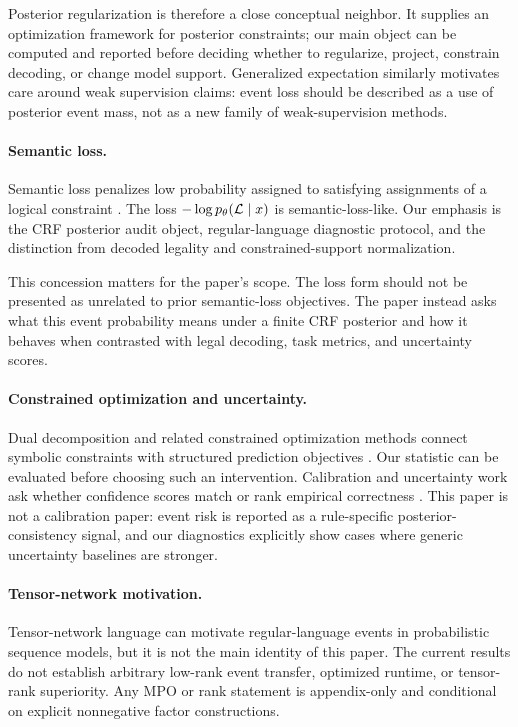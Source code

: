 Posterior regularization is therefore a close conceptual neighbor.  It supplies
an optimization framework for posterior constraints; our main object can be
computed and reported before deciding whether to regularize, project, constrain
decoding, or change model support.  Generalized expectation similarly motivates
care around weak supervision claims: event loss should be described as a use of
posterior event mass, not as a new family of weak-supervision methods.

\paragraph{Semantic loss.}
Semantic loss penalizes low probability assigned to satisfying assignments of a
logical constraint \citep{xu2018semantic}.  The loss
\(-\log p_{\theta}(\mathcal{L} \mid x)\) is semantic-loss-like.  Our emphasis is the CRF
posterior audit object, regular-language diagnostic protocol, and the
distinction from decoded legality and constrained-support normalization.

This concession matters for the paper's scope.  The loss form should not be
presented as unrelated to prior semantic-loss objectives.  The paper instead
asks what this event probability means under a finite CRF posterior and how it
behaves when contrasted with legal decoding, task metrics, and uncertainty
scores.

\paragraph{Constrained optimization and uncertainty.}
Dual decomposition and related constrained optimization methods connect
symbolic constraints with structured prediction objectives
\citep{rush2010dual}.  Our statistic can be evaluated before choosing such an
intervention.  Calibration and uncertainty work ask whether confidence scores
match or rank empirical correctness \citep{platt1999probabilities,guo2017calibration}.
This paper is not a calibration paper: event risk is reported as a
rule-specific posterior-consistency signal, and our diagnostics explicitly show
cases where generic uncertainty baselines are stronger.

\paragraph{Tensor-network motivation.}
Tensor-network language can motivate regular-language events in probabilistic
sequence models, but it is not the main identity of this paper.  The current
results do not establish arbitrary low-rank event transfer, optimized runtime,
or tensor-rank superiority.  Any MPO or rank statement is appendix-only and
conditional on explicit nonnegative factor constructions.


